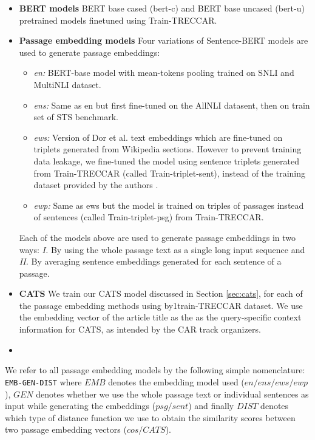 \begin{itemize}
    \item \textbf{BERT models} BERT base cased (bert-c) and BERT base uncased (bert-u) pretrained models finetuned using Train-TRECCAR.
    \item \textbf{Passage embedding models} Four variations of Sentence-BERT models are used to generate passage embeddings: 
    \begin{itemize}
        \item \textit{en:} BERT-base model with mean-tokens pooling trained on SNLI and MultiNLI dataset.
        \item \textit{ens:} Same as en but first fine-tuned on the AllNLI datasent, then on train set of STS benchmark.
        \item \textit{ews:} Version of Dor et al. text embeddings which are fine-tuned on triplets generated from Wikipedia sections. However to prevent training data leakage, we fine-tuned the model using sentence triplets generated from Train-TRECCAR (called Train-triplet-sent), instead of the training dataset provided by the authors .
        \item \textit{ewp:} Same as ews but the model is trained on triples of passages instead of sentences (called Train-triplet-psg) from Train-TRECCAR.
    \end{itemize}
    Each of the models above are used to generate passage embeddings in two ways: \textit{I. } By using the whole passage text as a single long input sequence and \textit{II. } By averaging sentence embeddings generated for each sentence of a passage. 
    \item \textbf{CATS} We train our CATS model discussed in Section \ref{sec:cats}, for each of the passage embedding methods using by1train-TRECCAR dataset. We use the embedding vector of the article title as the as the query-specific context information for CATS, as intended by the CAR track organizers.
    \item {}
\end{itemize}

We refer to all passage embedding models by the following simple nomenclature: \texttt{EMB-GEN-DIST} where $EMB$ denotes the embedding model used ($en/ens/ews/ewp$), $GEN$ denotes whether we use the whole passage text or individual sentences as input while generating the embeddings ($psg/sent$) and finally $DIST$ denotes which type of distance function we use to obtain the similarity scores between two passage embedding vectors ($cos/CATS$).

